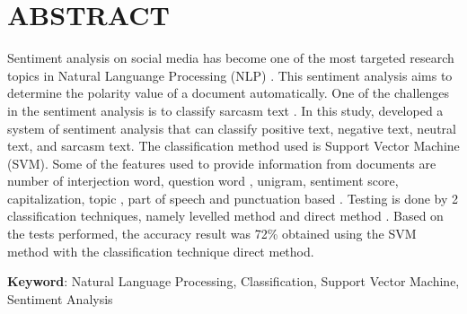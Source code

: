 \chapter*{ABSTRACT}
\noindent Sentiment analysis on social media has become one of the most targeted research topics in Natural Languange Processing (NLP) \cite{2}. This sentiment analysis aims to determine the polarity value of a document automatically. One of the challenges in the sentiment analysis is to classify sarcasm text \cite{3}. In this study, developed a system of sentiment analysis that can classify positive text, negative text, neutral text, and sarcasm text. The classification method used is Support Vector Machine (SVM). Some of the features used to provide information from documents are number of interjection word, question word \cite{5}, unigram, sentiment score, capitalization, topic \cite{4}, part of speech and punctuation based \cite{3}. Testing is done by 2 classification techniques, namely levelled method and direct method \cite{5}. Based on the tests performed, the accuracy result was 72\% obtained using the SVM method with the classification technique direct method.

\noindent\textbf{Keyword}: Natural Language Processing, Classification, Support Vector Machine, Sentiment Analysis